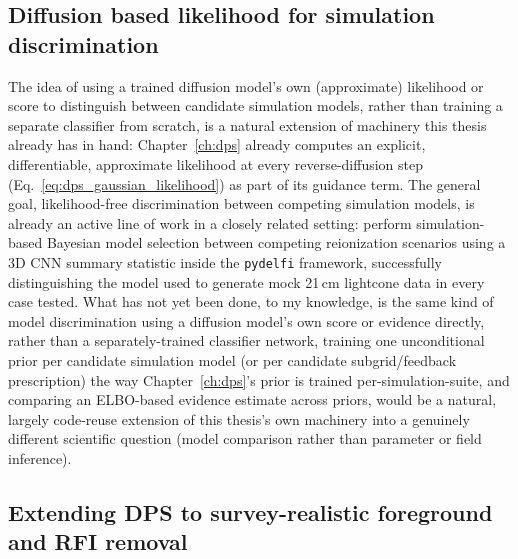 \subsection{Diffusion based likelihood for simulation discrimination}
\label{sec:conclusion_future_discrimination}

The idea of using a trained diffusion model's own (approximate) likelihood or score to distinguish between candidate simulation models, rather than training a separate classifier from scratch, is a natural extension of machinery this thesis already has in hand: Chapter~\ref{ch:dps} already computes an explicit, differentiable, approximate likelihood at every reverse-diffusion step (Eq.~\ref{eq:dps_gaussian_likelihood}) as part of its guidance term. The general goal, likelihood-free discrimination between competing simulation models, is already an active line of work in a closely related setting: \citet{binnie_2025} perform simulation-based Bayesian model selection between competing reionization scenarios using a 3D CNN summary statistic inside the \texttt{pydelfi} framework, successfully distinguishing the model used to generate mock 21\,cm lightcone data in every case tested. What has not yet been done, to my knowledge, is the same kind of model discrimination using a diffusion model's own score or evidence directly, rather than a separately-trained classifier network, training one unconditional prior per candidate simulation model (or per candidate subgrid/feedback prescription) the way Chapter~\ref{ch:dps}'s prior is trained per-simulation-suite, and comparing an ELBO-based evidence estimate across priors, would be a natural, largely code-reuse extension of this thesis's own machinery into a genuinely different scientific question (model comparison rather than parameter or field inference). 

\subsection{Extending DPS to survey-realistic foreground and RFI removal}
\label{sec:conclusion_future_ska}

